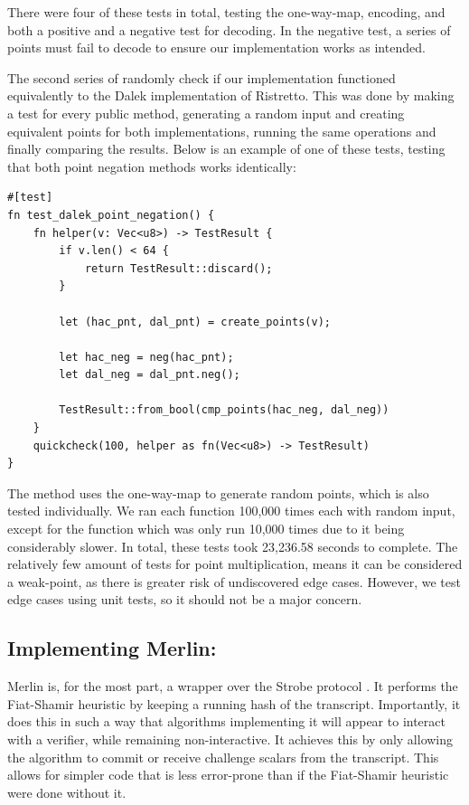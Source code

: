 \documentclass{article}
\newcommand*\ttvar[1]{\texttt{\expandafter\dottvar\detokenize{#1}\relax}}
\newcommand*\dottvar[1]{\ifx\relax#1\else
  \expandafter\ifx\string_#1\string_\allowbreak\else#1\fi
  \expandafter\dottvar\fi}
\begin{document}
There were four of these tests in total, testing the one-way-map,
encoding, and both a positive and a negative test for decoding. In the
negative test, a series of points must fail to decode to ensure our
implementation works as intended.

The second series of randomly check if our implementation functioned 
equivalently to the Dalek implementation of Ristretto. This was done 
by making a test for every public method, generating a random input 
and creating equivalent points for both implementations, running the 
same operations and finally comparing the results. Below is an example
of one of these tests, testing that both point negation methods works 
identically:

\begin{lstlisting}
#[test]
fn test_dalek_point_negation() {
	fn helper(v: Vec<u8>) -> TestResult {
		if v.len() < 64 {
			return TestResult::discard();
		}

		let (hac_pnt, dal_pnt) = create_points(v);

		let hac_neg = neg(hac_pnt);
		let dal_neg = dal_pnt.neg();

		TestResult::from_bool(cmp_points(hac_neg, dal_neg))
	}
	quickcheck(100, helper as fn(Vec<u8>) -> TestResult)
}
\end{lstlisting}

The \ttvar{create_points()} method uses the one-way-map to generate
random points, which is also tested individually. We ran each function
100,000 times each with random input, except for the \ttvar{mul()}
function which was only run 10,000 times due to it being considerably
slower. In total, these tests took 23,236.58 seconds to complete. The
relatively few amount of tests for point multiplication, means it can
be considered a weak-point, as there is greater risk of undiscovered
edge cases. However, we test edge cases using unit tests, so it should
not be a major concern.

\subsection{Implementing Merlin:} \label{implementing-merlin}

Merlin \cite{merlin} is, for the most part, a wrapper over the Strobe
protocol \cite{strobe}. It performs the Fiat-Shamir heuristic by keeping
a running hash of the transcript. Importantly, it does this in such a
way that algorithms implementing it will appear to interact with
a verifier, while remaining non-interactive. It achieves this by only
allowing the algorithm to commit or receive challenge scalars from the
transcript. This allows for simpler code that is less error-prone than
if the Fiat-Shamir heuristic were done without it.
\end{document}
